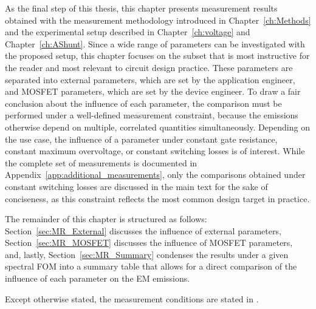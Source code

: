 
As the final step of this thesis, this chapter presents measurement results obtained with the measurement methodology introduced in Chapter~\ref{ch:Methods} and the experimental setup described in Chapter~\ref{ch:voltage} and Chapter~\ref{ch:AShunt}.
Since a wide range of parameters can be investigated with the proposed setup, this chapter focuses on the subset that is most instructive for the reader and most relevant to circuit design practice.
These parameters are separated into external parameters, which are set by the application engineer, and MOSFET parameters, which are set by the device engineer.
To draw a fair conclusion about the influence of each parameter, the comparison must be performed under a well-defined measurement constraint, because the emissions otherwise depend on multiple, correlated quantities simultaneously.
Depending on the use case, the influence of a parameter under constant gate resistance, constant maximum overvoltage, or constant switching losses is of interest.
While the complete set of measurements is documented in Appendix~\ref{app:additional_measurements}, only the comparisons obtained under constant switching losses are discussed in the main text for the sake of conciseness, as this constraint reflects the most common design target in practice.

The remainder of this chapter is structured as follows: Section~\ref{sec:MR_External} discusses the influence of external parameters, Section~\ref{sec:MR_MOSFET} discusses the influence of MOSFET parameters, and, lastly, Section~\ref{sec:MR_Summary} condenses the results under a given spectral FOM into a summary table that allows for a direct comparison of the influence of each parameter on the EM emissions.

Except otherwise stated, the measurement conditions are stated in .

